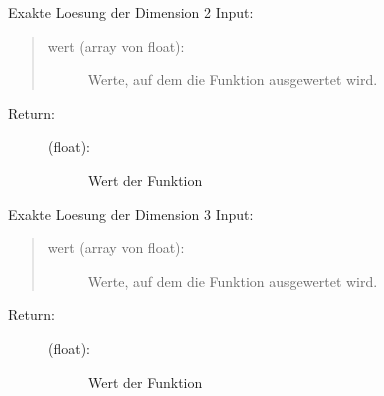 \documentclass[letterpaper,10pt,ngerman, oneside, openright]{sphinxmanual}
\begin{document}

\begin{fulllineitems}
\label{\detokenize{index:aufg_5_2.ulsg2}}
Exakte Loesung der Dimension 2
Input:
\begin{quote}
\begin{description}
\item[{wert (array von float):}] \leavevmode
Werte, auf dem die Funktion ausgewertet wird.

\end{description}
\end{quote}
\begin{description}
\item[{Return:}] \leavevmode\begin{description}
\item[{(float):}] \leavevmode
Wert der Funktion

\end{description}

\end{description}

\end{fulllineitems}


\begin{fulllineitems}
\label{\detokenize{index:aufg_5_2.ulsg3}}
Exakte Loesung der Dimension 3
Input:
\begin{quote}
\begin{description}
\item[{wert (array von float):}] \leavevmode
Werte, auf dem die Funktion ausgewertet wird.

\end{description}
\end{quote}
\begin{description}
\item[{Return:}] \leavevmode\begin{description}
\item[{(float):}] \leavevmode
Wert der Funktion

\end{description}

\end{description}

\end{fulllineitems}





\end{document}
